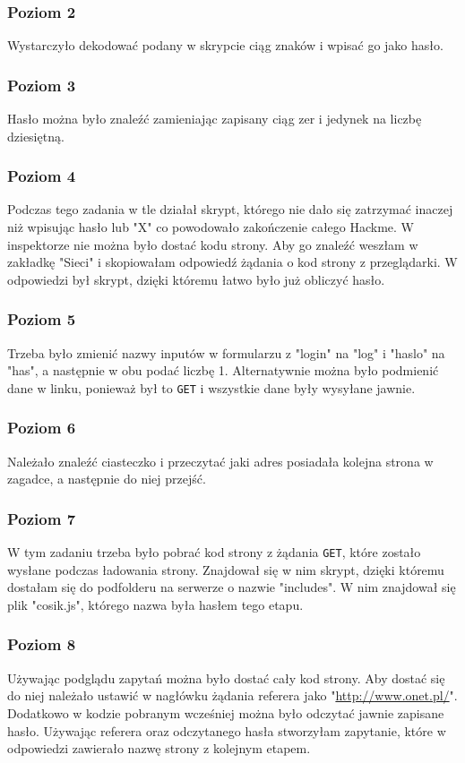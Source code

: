 \documentclass[12pt,a4paper,titlepage]{article}
\begin{document}
\subsubsection{Poziom 2}
Wystarczyło dekodować podany w skrypcie ciąg znaków i wpisać go jako hasło.
\subsubsection{Poziom 3}
Hasło można było znaleźć zamieniając zapisany ciąg zer i jedynek na liczbę dziesiętną.
\subsubsection{Poziom 4}
Podczas tego zadania w tle działał skrypt, którego nie dało się zatrzymać inaczej niż wpisując hasło lub "X" co powodowało zakończenie całego Hackme. W inspektorze nie można było dostać kodu strony. Aby go znaleźć weszłam w zakładkę "Sieci" i skopiowałam odpowiedź żądania o kod strony z przeglądarki. W odpowiedzi był skrypt, dzięki któremu łatwo było już obliczyć hasło.
\subsubsection{Poziom 5}
Trzeba było zmienić nazwy inputów w formularzu z "login" na "log" i "haslo" na "has", a następnie w obu podać liczbę 1. Alternatywnie można było podmienić dane w linku, ponieważ był to \texttt{GET} i wszystkie dane były wysyłane jawnie.
\subsubsection{Poziom 6}
Należało znaleźć ciasteczko i przeczytać jaki adres posiadała kolejna strona w zagadce, a następnie do niej przejść.
\subsubsection{Poziom 7}
W tym zadaniu trzeba było pobrać kod strony z żądania \texttt{GET}, które zostało wysłane podczas ładowania strony. Znajdował się w nim skrypt, dzięki któremu dostałam się do podfolderu na serwerze o nazwie "includes". W nim znajdował się plik "cosik.js", którego nazwa była hasłem tego etapu.
\subsubsection{Poziom 8}
Używając podglądu zapytań można było dostać cały kod strony. Aby dostać się do niej należało ustawić w nagłówku żądania referera jako "\url{http://www.onet.pl/}". Dodatkowo w kodzie pobranym wcześniej można było odczytać jawnie zapisane hasło. Używając referera oraz odczytanego hasła stworzyłam zapytanie, które w odpowiedzi zawierało nazwę strony z kolejnym etapem.
\end{document}
